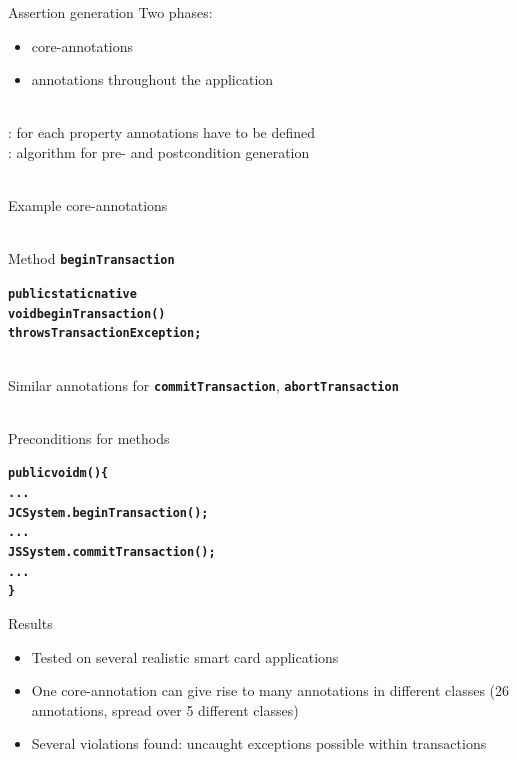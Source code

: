 \documentclass[final,nocolorBG,a4,mobius,nototal,pdf,slideColor]{prosper}
\newcommand{\textttbf}[1]{\texttt{\textbf{#1}}}
\begin{document}
\begin{slide}{Assertion generation}
Two phases:
\begin{itemize}
\item {} core-annotations
\item {} annotations throughout the application
\end{itemize}
\ \smallskip\\
: for each property annotations have to be defined
\bigskip\\
: algorithm for pre- and postcondition generation\\ \ \\
\end{slide}

\begin{slide}{Example core-annotations}
\begin{alltt}
\end{alltt}
\ \smallskip\\
Method \textttbf{beginTransaction}
\begin{alltt}
\textbf{public static native 
   void beginTransaction() 
        throws TransactionException;}
\end{alltt}
\ \smallskip\\
Similar annotations for \textttbf{commitTransaction},
\textttbf{abortTransaction} \\ \
\end{slide}


\begin{slide}{Preconditions for methods}
\begin{alltt}
\textbf{public void m() \{
   ...
   JCSystem.beginTransaction();
   ...
   JSSystem.commitTransaction();
   ...
   \}}
\end{alltt}
\end{slide}

\begin{slide}{Results}
\begin{itemize}
\item Tested on several realistic smart card applications
\item One core-annotation can give rise to many annotations in
different classes (26 annotations, spread over 5 different classes)
\item Several violations found: uncaught exceptions possible within
transactions 
\end{itemize}
\end{slide}
\end{document}
